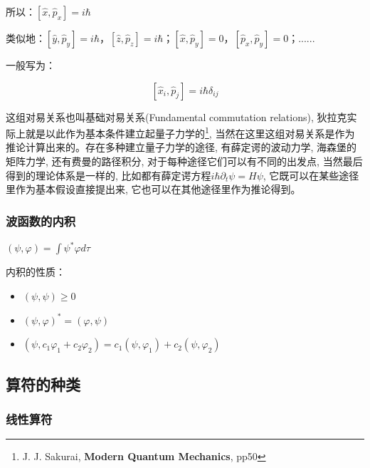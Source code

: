 所以：$\left[ {\hat x,\hat p_x } \right] = i\hbar $

类似地：$\left[ {\hat y,\hat p_y } \right] = i\hbar $，$\left[ {\hat z,\hat p_z } \right] = i\hbar $；$\left[ {\hat x,\hat p_y } \right] = 0$，$\left[ {\hat p_x ,\hat p_y } \right] = 0$；......

一般写为：

\begin{equation}\label{fundamental commutation relations}
 \left[ {\hat x_i ,\hat p_j } \right] = i\hbar \delta _{ij}
\end{equation}


这组对易关系也叫基础对易关系(Fundamental commutation relations),
狄拉克实际上就是以此作为基本条件建立起量子力学的\footnote{J. J.
Sakurai, \textbf{Modern Quantum Mechanics}, pp50},
当然在这里这组对易关系是作为推论计算出来的。存在多种建立量子力学的途径,
有薛定谔的波动力学, 海森堡的矩阵力学, 还有费曼的路径积分,
对于每种途径它们可以有不同的出发点, 当然最后得到的理论体系是一样的,
比如都有薛定谔方程$i \hbar \partial_t \psi = H \psi$,
它既可以在某些途径里作为基本假设直接提出来,
它也可以在其他途径里作为推论得到。


\subsubsection{波函数的内积}

$\left( {\psi ,\varphi } \right) = \int {\psi ^* \varphi d\tau } $

内积的性质：

\begin{itemize}
    \item $\left( {\psi ,\psi } \right) \ge 0$

    \item $\left( {\psi ,\varphi } \right)^*  = \left( {\varphi ,\psi } \right)$

    \item $\left( {\psi ,c_1 \varphi _1  + c_2 \varphi _2 } \right) = c_1 \left( {\psi ,\varphi _1 } \right) + c_2 \left( {\psi ,\varphi _2 } \right)$
   \end{itemize}




\subsection{算符的种类}

\subsubsection{线性算符}

